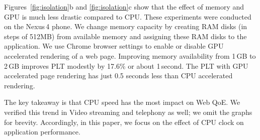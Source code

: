 Figures~\ref{fig:isolation}b and \ref{fig:isolation}c show that the effect of memory and GPU is much less drastic compared to CPU. These experiments were conducted on the Nexus\,4 phone.
We change memory capacity by creating RAM disks \cite{ramdisks} (in steps of 512MB) from available memory and assigning these RAM disks to the application.  %
We use Chrome browser settings to enable or disable  GPU accelerated rendering of a web page. Improving memory availability from 1\,GB to 2\,GB improves PLT  modestly by 17.6\% or about 1\,second. 
The PLT with GPU accelerated page rendering has just 0.5 seconds less than CPU accelerated rendering.  

The key takeaway is that CPU speed has the most impact on Web QoE. We verified this trend in Video streaming and telephony as well; we omit the graphs for brevity. 
Accordingly, in this paper, we focus on the effect of CPU clock on application performance. 


 
